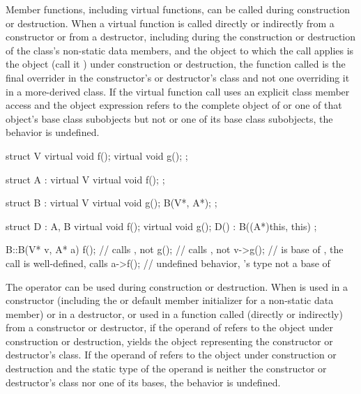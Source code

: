 \pnum
{}%
%
%
%
Member functions, including virtual functions, can be called
during construction or destruction.
When a virtual function is called directly or indirectly from a constructor
or from a destructor,
including during the construction or destruction of the class's non-static data
members,
and the object to which the call applies is the object (call it ) under construction or
destruction,
the function called is the
final overrider in the constructor's or destructor's class and not one
overriding it in a more-derived class.
If the virtual function call uses an explicit class member access
and the object expression refers to
the complete object of  or one of that object's base class subobjects
but not  or one of its base class subobjects, the behavior
is undefined.
\begin{example}

\begin{codeblock}
struct V {
  virtual void f();
  virtual void g();
};

struct A : virtual V {
  virtual void f();
};

struct B : virtual V {
  virtual void g();
  B(V*, A*);
};

struct D : A, B {
  virtual void f();
  virtual void g();
  D() : B((A*)this, this) { }
};

B::B(V* v, A* a) {
  f();              // calls , not 
  g();              // calls , not 
  v->g();           //  is base of , the call is well-defined, calls 
  a->f();           // undefined behavior, 's type not a base of 
}
\end{codeblock}
\end{example}

\pnum
{}%
%
%
%
The
operator can be used during construction or destruction.
When
is used in a constructor (including the
 or default member initializer
for a non-static data member)
or in a destructor, or used in a function called (directly or indirectly) from
a constructor or destructor, if the operand of
refers to the object under construction or destruction,
yields the
object representing the constructor or destructor's class.
If the operand of
refers to the object under construction or destruction and the static type of
the operand is neither the constructor or destructor's class nor one of its
bases, the behavior is undefined.


